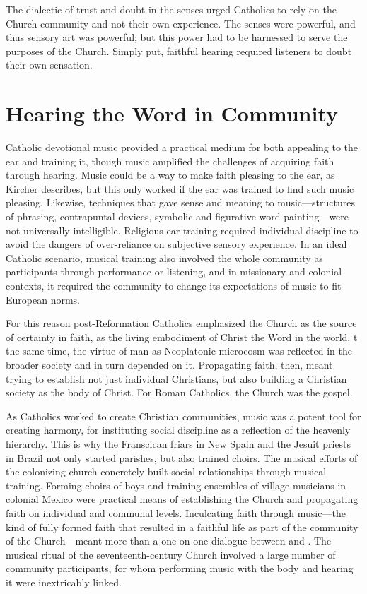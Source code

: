 The dialectic of trust and doubt in the senses urged Catholics to rely on the Church community and not their own experience.
The senses were powerful, and thus sensory art was powerful; but this power had to be harnessed to serve the purposes of the Church.
Simply put, faithful hearing required listeners to doubt their own sensation.

\section{Hearing the Word in Community}

Catholic devotional music provided a practical medium for both appealing to the ear and training it, though music amplified the challenges of acquiring faith through hearing.
Music could be a way to make faith pleasing to the ear, as Kircher  describes, but this only worked if the ear was trained to find such music pleasing.
Likewise, techniques that gave sense and meaning to music---structures of phrasing, contrapuntal devices, symbolic and figurative word-painting---were not universally intelligible.
Religious ear training required individual discipline to avoid the dangers of over-reliance on subjective sensory experience.
In an ideal Catholic scenario, musical training also involved the whole community as participants through performance or listening, and in missionary and colonial contexts, it required the community to change its expectations of music to fit European norms.

For this reason post-Reformation Catholics emphasized the Church as the source of certainty in faith, as the living embodiment of Christ the Word in the world.
t the same time, the virtue of man as Neoplatonic microcosm was reflected in the broader society and in turn depended on it.
Propagating faith, then, meant trying to establish not just individual Christians, but also building a Christian society as the body of Christ.
For Roman Catholics, the Church was the gospel.

As Catholics worked to create Christian communities, music was a potent tool for creating harmony, for instituting social discipline as a reflection of the heavenly hierarchy.%
    \Autocite{Baker:Harmony}
This is why the Franscican friars in New Spain and the Jesuit priests in Brazil not only started parishes, but also trained choirs.
The musical efforts of the colonizing church concretely built social relationships through musical training.
Forming choirs of boys and training ensembles of village musicians in colonial Mexico were practical means of establishing the Church and propagating faith on individual and communal levels.
Inculcating faith through music---the kind of fully formed faith that resulted in a faithful life as part of the community of the Church---meant more than a one-on-one dialogue between  and .
The musical ritual of the seventeenth-century Church involved a large number of community participants, for whom performing music with the body and hearing it were inextricably linked.

